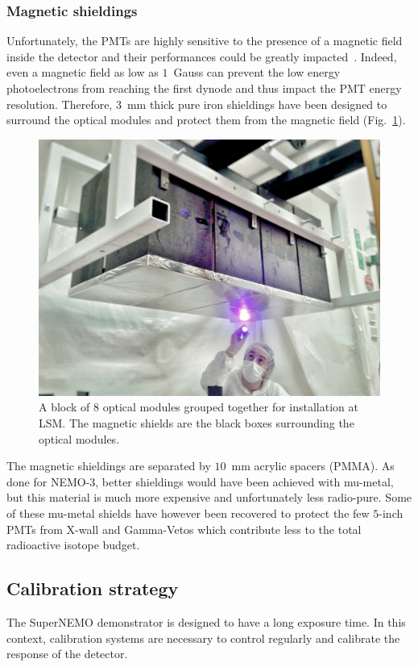 \subsubsection*{Magnetic shieldings}

Unfortunately, the PMTs are highly sensitive to the presence of a magnetic field inside the detector and their performances could be greatly impacted~\cite{CalvezThesis,internal:magnetic_field}.
Indeed, even a magnetic field as low as $1$~Gauss can prevent the low energy photoelectrons from reaching the first dynode and thus impact the PMT energy resolution.
Therefore, $3$~mm thick pure iron shieldings have been designed to surround the optical modules and protect them from the magnetic field (Fig.~\ref{fig:magnetic_shields}).
\begin{figure}[h!]
\centering
\includegraphics[height=0.5\textwidth]{SNdemonstrator/fig_SNdemonstrator/magnetic_shields.jpg}
\caption{A block of $8$ optical modules grouped together for installation at LSM.
  The magnetic shields are the black boxes surrounding the optical modules.
\label{fig:magnetic_shields}}
\end{figure}
The magnetic shieldings are separated by $10$~mm acrylic spacers (PMMA).
As done for NEMO-$3$, better shieldings would have been achieved with mu-metal, but this material is much more expensive and unfortunately less radio-pure.
Some of these mu-metal shields have however been recovered to protect the few $5$-inch PMTs from X-wall and Gamma-Vetos which contribute less to the total radioactive isotope budget.


\subsection{Calibration strategy}
\label{subsec:calib}

The SuperNEMO demonstrator is designed to have a long exposure time.
In this context, calibration systems are necessary to control regularly and calibrate the response of the detector.


